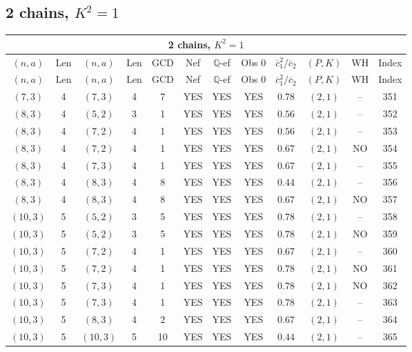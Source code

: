 \subsection{2 chains, $K^2 = 1$}
\begin{longtable}{|c|c|c|c|c|c|c|c|c|c|c|c|}
\hline
\multicolumn{12}{|c|}{2 chains, $K^2 = 1$}\\
\hline
$(n,a)$ & Len & $(n,a)$ & Len & GCD & Nef & $\mathbb Q$-ef & Obs 0 & $\overline c_1^2 / \overline c_2$ & $(P,K)$ & WH & Index\\
\hline
\endfirsthead

\hline
$(n,a)$ & Len & $(n,a)$ & Len & GCD & Nef & $\mathbb Q$-ef & Obs 0 & $\overline c_1^2 / \overline c_2$ & $(P,K)$ & WH & Index\\
\hline
\endhead
\hline
\endfoot

$(7,3)$ & 4 & $(7,3)$ & 4 & 7 & YES & YES & YES & $0.78$ & $(2,1)$ & -- & 351\\
$(8,3)$ & 4 & $(5,2)$ & 3 & 1 & YES & YES & YES & $0.56$ & $(2,1)$ & -- & 352\\
$(8,3)$ & 4 & $(7,2)$ & 4 & 1 & YES & YES & YES & $0.56$ & $(2,1)$ & -- & 353\\
$(8,3)$ & 4 & $(7,2)$ & 4 & 1 & YES & YES & YES & $0.67$ & $(2,1)$ & NO & 354\\
$(8,3)$ & 4 & $(7,3)$ & 4 & 1 & YES & YES & YES & $0.67$ & $(2,1)$ & -- & 355\\
$(8,3)$ & 4 & $(8,3)$ & 4 & 8 & YES & YES & YES & $0.44$ & $(2,1)$ & -- & 356\\
$(8,3)$ & 4 & $(8,3)$ & 4 & 8 & YES & YES & YES & $0.67$ & $(2,1)$ & NO & 357\\
$(10,3)$ & 5 & $(5,2)$ & 3 & 5 & YES & YES & YES & $0.78$ & $(2,1)$ & -- & 358\\
$(10,3)$ & 5 & $(5,2)$ & 3 & 5 & YES & YES & YES & $0.78$ & $(2,1)$ & NO & 359\\
$(10,3)$ & 5 & $(7,2)$ & 4 & 1 & YES & YES & YES & $0.67$ & $(2,1)$ & -- & 360\\
$(10,3)$ & 5 & $(7,2)$ & 4 & 1 & YES & YES & YES & $0.78$ & $(2,1)$ & NO & 361\\
$(10,3)$ & 5 & $(7,3)$ & 4 & 1 & YES & YES & YES & $0.78$ & $(2,1)$ & NO & 362\\
$(10,3)$ & 5 & $(7,3)$ & 4 & 1 & YES & YES & YES & $0.78$ & $(2,1)$ & -- & 363\\
$(10,3)$ & 5 & $(8,3)$ & 4 & 2 & YES & YES & YES & $0.67$ & $(2,1)$ & -- & 364\\
$(10,3)$ & 5 & $(10,3)$ & 5 & 10 & YES & YES & YES & $0.44$ & $(2,1)$ & -- & 365\\

\end{longtable}
